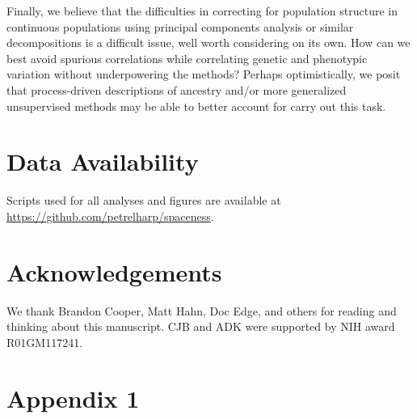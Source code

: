 \documentclass[10pt,twoside,lineno,hidelinks]{preprint}
\begin{document}
Finally, we believe that the difficulties in correcting for population structure in continuous populations 
using principal components analysis or similar decompositions is a difficult issue, well worth considering on its own.
How can we best avoid spurious correlations while correlating genetic and phenotypic variation 
without underpowering the methods?
Perhaps optimistically,
we posit that process-driven descriptions of ancestry 
and/or more generalized unsupervised methods may be able to better account for carry out this task.


\section{Data Availability}
Scripts used for all analyses and figures are available at \url{https://github.com/petrelharp/spaceness}. 

\section{Acknowledgements}
We thank Brandon Cooper, Matt Hahn, Doc Edge, and others for reading and thinking about this manuscript. 
CJB and ADK were supported by NIH award R01GM117241. 





\beginappendix
\section{Appendix 1}
\end{document}
